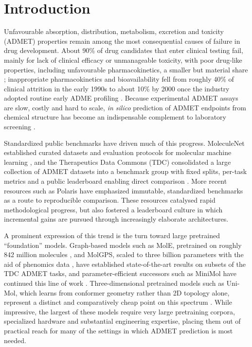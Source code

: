 
\section{Introduction}\label{sec:background}

Unfavourable absorption, distribution, metabolism, excretion and toxicity (ADMET) properties remain among the most consequential causes of failure in drug development. About 90\% of drug candidates that enter clinical testing fail, mainly for lack of clinical efficacy or unmanageable toxicity, with poor drug-like properties, including unfavourable pharmacokinetics, a smaller but material share \cite{sun2022why90}; inappropriate pharmacokinetics and bioavailability fell from roughly 40\% of clinical attrition in the early 1990s to about 10\% by 2000 once the industry adopted routine early ADME profiling \cite{kola2004attrition}. Because experimental ADMET assays are slow, costly and hard to scale, \emph{in silico} prediction of ADMET endpoints from chemical structure has become an indispensable complement to laboratory screening \cite{fu2024admetlab,komura2023trends}.

Standardized public benchmarks have driven much of this progress. MoleculeNet established curated datasets and evaluation protocols for molecular machine learning \cite{wu2018moleculenet}, and the Therapeutics Data Commons (TDC) consolidated a large collection of ADMET datasets into a benchmark group with fixed splits, per-task metrics and a public leaderboard enabling direct comparison \cite{huang2021tdc}. More recent resources such as Polaris have emphasized immutable, standardized benchmarks as a route to reproducible comparison. These resources catalysed rapid methodological progress, but also fostered a leaderboard culture in which incremental gains are pursued through increasingly elaborate architectures.

A prominent expression of this trend is the turn toward large pretrained ``foundation'' models. Graph-based models such as MolE, pretrained on roughly 842 million molecules \cite{mendezlucio2024mole}, and MolGPS, scaled to three billion parameters with the aid of phenomics data \cite{sypetkowski2024molgps}, have established state-of-the-art results on subsets of the TDC ADMET tasks, and parameter-efficient successors such as MiniMol have continued this line of work \cite{klaser2024minimol}. Three-dimensional pretrained models such as Uni-Mol, which learns from conformer geometry rather than 2D topology alone, represent a distinct and comparatively cheap point on this spectrum \cite{zhou2023unimol}. While impressive, the largest of these models require very large pretraining corpora, specialized hardware and substantial engineering expertise, placing them out of practical reach for many of the settings in which ADMET prediction is most needed.

